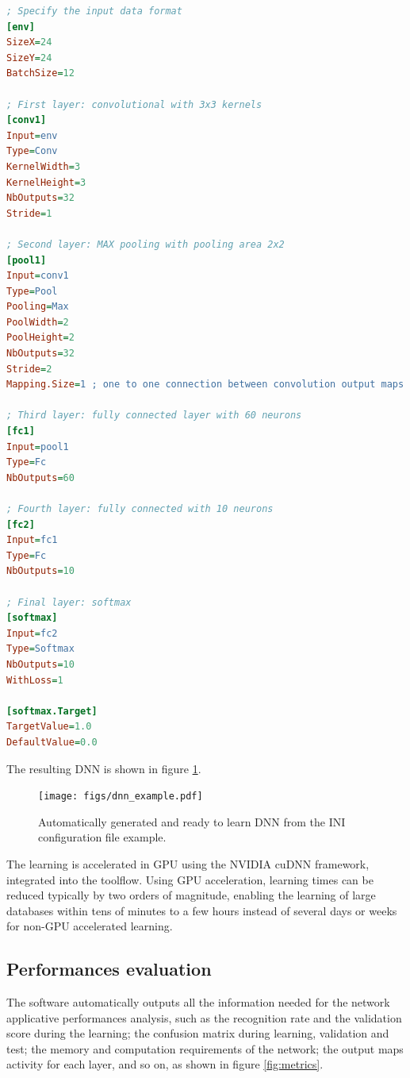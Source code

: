 \documentclass[a4paper,11pt,oneside]{article}
\begin{document}
\begin{lstlisting}[language=ini]
; Specify the input data format
[env]
SizeX=24
SizeY=24
BatchSize=12

; First layer: convolutional with 3x3 kernels
[conv1]
Input=env
Type=Conv
KernelWidth=3
KernelHeight=3
NbOutputs=32
Stride=1

; Second layer: MAX pooling with pooling area 2x2
[pool1]
Input=conv1
Type=Pool
Pooling=Max
PoolWidth=2
PoolHeight=2
NbOutputs=32
Stride=2
Mapping.Size=1 ; one to one connection between convolution output maps and pooling input maps

; Third layer: fully connected layer with 60 neurons
[fc1]
Input=pool1
Type=Fc
NbOutputs=60

; Fourth layer: fully connected with 10 neurons
[fc2]
Input=fc1
Type=Fc
NbOutputs=10

; Final layer: softmax
[softmax]
Input=fc2
Type=Softmax
NbOutputs=10
WithLoss=1

[softmax.Target]
TargetValue=1.0
DefaultValue=0.0
\end{lstlisting}

The resulting DNN is shown in figure \ref{fig:DNNExample}.

\begin{figure}[!htb]
  \centering
  \texttt{[image: figs/dnn\_example.pdf]}
  \caption{Automatically generated and ready to learn DNN from the INI
  configuration file example.}
  \label{fig:DNNExample}
\end{figure}

The learning is accelerated in GPU using the NVIDIA\textregistered{} cuDNN
framework, integrated into the toolflow. Using GPU acceleration, learning times
 can be reduced typically by two orders of magnitude, enabling the learning of
  large databases within tens of minutes to a few hours instead of several days
   or weeks for non-GPU accelerated learning.


\subsection{Performances evaluation}

The software automatically outputs all the information needed for the network
 applicative performances analysis, such as the recognition rate and the
 validation score during the learning; the confusion matrix during learning,
  validation and test; the memory and computation requirements of the network;
  the output maps activity for each layer, and so on, as shown in figure
   \ref{fig:metrics}.
\end{document}
